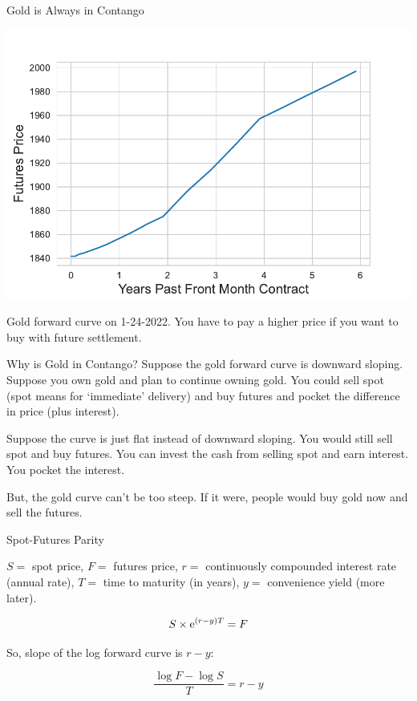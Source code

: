 \documentclass[xcolor=dvipsnames,10pt]{beamer}
\begin{document}
\begin{frame}{Gold is Always in Contango}
    \begin{center}
        \includegraphics[scale=0.6]{Images/fig_gold.pdf}
    \end{center}
    Gold forward curve on 1-24-2022.  You have to pay a higher price if you want to buy with future settlement.
\end{frame}

\begin{frame}{Why is Gold in Contango?}
    Suppose the gold forward curve is downward sloping.  Suppose you own gold and plan to continue owning gold.  You could sell spot (spot means for `immediate' delivery) and buy futures and pocket the difference in price (plus interest).
    
    Suppose the curve is just flat instead of downward sloping.  You would still sell spot and buy futures.  You can invest the cash from selling spot and earn interest.  You pocket the interest.
    
    But, the gold curve can't be too steep.  If it were, people would buy gold now and sell the futures.
\end{frame}

\begin{frame}{Spot-Futures Parity}

$S=$ spot price, $F=$ futures price, $r=$ continuously compounded interest rate (annual rate), $T=$ time to maturity (in years), $y=$ convenience yield (more later).

$$S \times \mathrm{e}^{(r-y)T} = F$$

So, slope of the log forward curve is $r-y$:

$$\frac{\log F - \log S}{T} = r-y$$
\end{frame}
\end{document}
